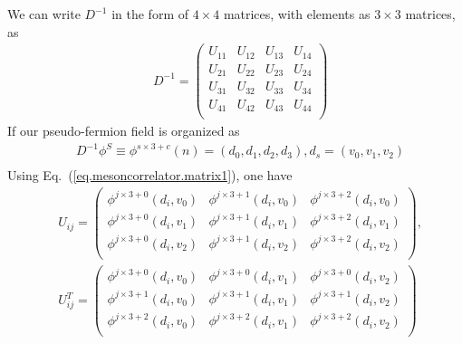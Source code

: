 We can write $D^{-1}$ in the form of $4\times 4$ matrices, with elements as $3\times 3$ matrices, as
\begin{equation}
\begin{split}
&D^{-1}=\left(\begin{array}{cccc} 
U_{11} & U_{12} & U_{13} & U_{14} \\
U_{21} & U_{22} & U_{23} & U_{24} \\
U_{31} & U_{32} & U_{33} & U_{34} \\
U_{41} & U_{42} & U_{43} & U_{44} \\
\end{array}\right)
\end{split}
\end{equation}
If our pseudo-fermion field is organized as
\begin{equation}
\begin{split}
&D^{-1}\phi^S\equiv \phi ^{s\times 3+c}(n)=\left(d_0,d_1,d_2,d_3\right), d_s=\left(v_0,v_1,v_2\right)\\
\end{split}
\end{equation}
Using Eq.~(\ref{eq.mesoncorrelator.matrix1}), one have
\begin{equation}
\begin{split}
&U_{ij}=\left(\begin{array}{ccc}
\phi ^{j\times 3 + 0} (d_i,v_0) & \phi ^{j\times 3 + 1}(d_i,v_0) & \phi ^{j\times 3 + 2}(d_i,v_0)  \\
\phi ^{j\times 3 + 0} (d_i,v_1) & \phi ^{j\times 3 + 1}(d_i,v_1) & \phi ^{j\times 3 + 2}(d_i,v_1)  \\
\phi ^{j\times 3 + 0} (d_i,v_2) & \phi ^{j\times 3 + 1}(d_i,v_2) & \phi ^{j\times 3 + 2}(d_i,v_2)  \\
\end{array}\right),\\
&U_{ij}^T=\left(\begin{array}{ccc}
\phi ^{j\times 3 + 0} (d_i,v_0) & \phi ^{j\times 3 + 0}(d_i,v_1) & \phi ^{j\times 3 + 0}(d_i,v_2)  \\
\phi ^{j\times 3 + 1} (d_i,v_0) & \phi ^{j\times 3 + 1}(d_i,v_1) & \phi ^{j\times 3 + 1}(d_i,v_2)  \\
\phi ^{j\times 3 + 2} (d_i,v_0) & \phi ^{j\times 3 + 2}(d_i,v_1) & \phi ^{j\times 3 + 2}(d_i,v_2)  \\
\end{array}\right)\\
\end{split}
\end{equation}
